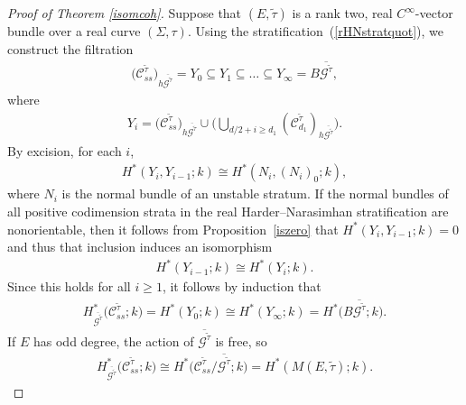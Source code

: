 \documentclass[pdftex]{sigma}
\numberwithin{equation}{section}
\begin{document}
\begin{proof}[Proof of Theorem \ref{isomcoh}]
Suppose that $(E,\tilde{\tau})$ is a rank two, real $C^{\infty}$-vector bundle over a real curve $(\Sigma, \tau)$. Using the stratif\/ication~(\ref{rHNstratquot}), we construct the f\/iltration
\begin{gather*} \big({\mathcal C}_{ss}^{\tilde{\tau}}\big)_{h\overline{{\mathcal G}^{\tilde{\tau}}}} = Y_0 \subseteq Y_1 \subseteq \dots \subseteq Y_{\infty} = B\overline{{\mathcal G}^{\tilde{\tau}}}, \end{gather*}
where \begin{gather*} Y_i = \big({\mathcal C}_{ss}^{\tilde{\tau}}\big)_{h\overline{{\mathcal G}^{\tilde{\tau}}}} \cup \bigg( \bigcup_{ d/2+ i \geq d_1} ({\mathcal C}_{d_1}^{\tilde{\tau}})_{h\overline{{\mathcal G}^{\tilde{\tau}}}} \bigg).\end{gather*}
By excision, for each $i$, \begin{gather*}H^*(Y_i, Y_{i-1};k) \cong H^*(N_i, (N_i)_0; k),\end{gather*}
where $N_i$ is the normal bundle of an unstable stratum. If the normal bundles of all positive codimension strata in the real Harder--Narasimhan stratif\/ication are nonorientable, then it follows from Proposition~\ref{iszero} that $H^*(Y_i, Y_{i-1};k) = 0$ and thus that inclusion induces an isomorphism \begin{gather*}H^*(Y_{i-1};k) \cong H^*(Y_{i};k). \end{gather*}
Since this holds for all $i\geq 1$, it follows by induction that
\begin{gather*} H^*_{\overline{{\mathcal G}^{\tilde{\tau}}}}\big( {\mathcal C}_{ss}^{\tilde{\tau}};k\big) = H^*(Y_0;k) \cong H^*(Y_{\infty};k) = H^*\big(B\overline{{\mathcal G}^{\tilde{\tau}}};k\big). \end{gather*}
If $E$ has odd degree, the action of $\overline{{\mathcal G}^{\tilde{\tau}}}$ is free, so \begin{gather*}H^*_{\overline{{\mathcal G}^{\tilde{\tau}}}}\big( {\mathcal C}_{ss}^{\tilde{\tau}};k\big) \cong H^*\big( {\mathcal C}_{ss}^{\tilde{\tau}}/\overline{{\mathcal G}^{\tilde{\tau}}};k\big) = H^*(M(E,\tilde{\tau});k).\end{gather*}


\end{proof}
\end{document}
